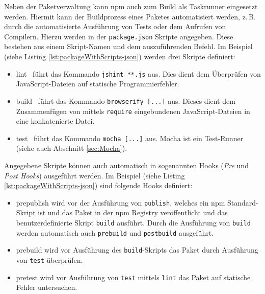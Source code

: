 \begin{figure}[H]
	
\end{figure}

Neben der Paketverwaltung kann npm auch zum Build als Taskrunner eingesetzt werden. Hiermit kann der Buildprozess eines Paketes automatisiert werden, z.\,B. durch die automatisierte Ausführung von Tests oder dem Aufrufen von Compilern. Hierzu werden in der \texttt{package.json} Skripte angegeben. Diese bestehen aus einem Skript-Namen und dem auszuführenden Befehl. Im Beispiel (siehe Listing \ref{lst:packageWithScripts-json}) werden drei Skripte definiert:\cite{cirkel-npmAsABuildTool}
\begin{itemize}
	\item \glqq lint\grqq~ führt das Kommando \texttt{jshint **.js} aus. Dies dient dem Überprüfen von JavaScript-Dateien auf statische Programmierfehler\cite{jshint-about}.
	\item \glqq build\grqq~ führt das Kommando \texttt{browserify [...]} aus. Dieses dient dem Zusammenfügen von mittels \texttt{require} eingebundenen JavaScript-Dateien in eine konkatenierte Datei\cite{browserify-about}.
	\item \glqq test\grqq~ führt das Kommando \texttt{mocha [...]} aus. Mocha ist ein Test-Runner (siehe auch Abschnitt \ref{sec:Mocha}).
\end{itemize}

Angegebene Skripte können auch automatisch in sogenannten Hooks (\textit{Pre} und \textit{Post Hooks}) ausgeführt werden. Im Beispiel (siehe Listing \ref{lst:packageWithScripts-json}) sind folgende Hooks definiert:\cite{cirkel-npmAsABuildTool}
\begin{itemize}
	\item \glqq prepublish\grqq{} wird vor der Ausführung von \texttt{publish}, welches ein npm Standard-Skript ist und das Paket in der npm Registry veröffentlicht\cite{npm-publish} und das benutzerdefinierte Skript \texttt{build} ausführt. Durch die Ausführung von \texttt{build} werden automatisch auch \texttt{prebuild} und \texttt{postbuild} ausgeführt.
	\item \glqq prebuild\grqq{} wird vor Ausführung des \texttt{build}-Skripts das Paket durch Ausführung von \texttt{test} überprüfen.
	\item \glqq pretest\grqq{} wird vor Ausführung von \texttt{test} mittels \texttt{lint} das Paket auf statische Fehler untersuchen.
\end{itemize}

